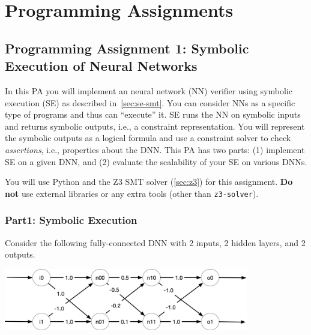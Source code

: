 \documentclass[oneside,11pt,dvipsnames]{book}
\numberwithin{equation}{section}
\theoremstyle{definition}
\theoremstyle{remark}
\begin{document}
\chapter{Programming Assignments}\label{chap:pa}
\section{Programming Assignment 1: Symbolic Execution of Neural Networks}\label{sec:pa1}


In this PA you will implement an neural network (NN) verifier using symbolic execution (SE) as described in~\autoref{sec:se-smt}. You can consider NNs as a specific type of programs and thus can ``execute'' it.  SE runs the NN on symbolic inputs and returns symbolic outputs, i.e., a constraint representation.  You will represent the symbolic outputs as a logical formula and use a constraint solver to check \emph{assertions}, i.e., properties about the DNN. This PA has two parts: (1) implement SE on a given DNN, and (2) evaluate the scalability of your SE on various DNNs.

You will use Python and the Z3 SMT solver (\autoref{sec:z3}) for this assignment. \textbf{Do not} use external libraries or any extra tools (other than \texttt{z3-solver}).

\subsection{Part1: Symbolic Execution}

Consider the following fully-connected DNN with 2 inputs, 2 hidden layers, and 2 outputs.

\begin{center}
\includegraphics[width=0.8\textwidth]{figure/dnn1.png}
\end{center}
\end{document}
